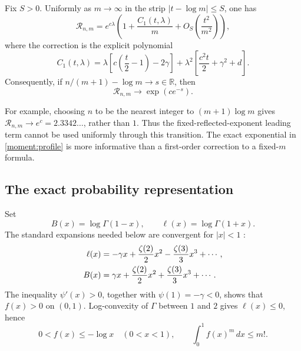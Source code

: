 \begin{theorem}\label{moment:thm:transition}
Fix $S>0$. Uniformly as $m\to\infty$ in the strip
$|t-\log m|\le S$, one has
\begin{equation}\label{moment:transition}
 \boxed{\displaystyle
 \mathcal R_{n,m}=e^{c\lambda}
 \left(1+\frac{C_1(t,\lambda)}m
              +O_S\!\left(\frac{t^2}{m^2}\right)\right),}
\end{equation}
where the correction is the explicit polynomial
\begin{equation}\label{moment:C1}
 C_1(t,\lambda)
 =\lambda\left[c\left(\frac t2-1\right)-2\gamma\right]
  +\lambda^2\left[\frac{c^2t}{2}+\gamma^2+d\right].
\end{equation}
Consequently, if $n/(m+1)-\log m\to s\in\mathbb R$, then
\begin{equation}\label{moment:profile}
 \mathcal R_{n,m}\longrightarrow \exp\!\left(c e^{-s}\right).
\end{equation}
\end{theorem}

For example, choosing $n$ to be the nearest integer to $(m+1)\log m$
gives $\mathcal R_{n,m}\to e^c=2.3342\ldots$, rather than $1$.
Thus the fixed-reflected-exponent leading term cannot be used uniformly
through this transition. The exact exponential in \eqref{moment:profile}
is more informative than a first-order correction to a fixed-$m$ formula.

\subsection{The exact probability representation}
Set
\[
 B(x)=\log\Gamma(1-x),\qquad \ell(x)=\log\Gamma(1+x).
\]
The standard expansions needed below are convergent for $|x|<1$
\cite[Section 5.7]{DLMF}:
\begin{align}\label{moment:endpoint-series}
 \ell(x)&=-\gamma x+\frac{\zeta(2)}2x^2
                    -\frac{\zeta(3)}3x^3+\cdots,\notag\\
 B(x)&=\gamma x+\frac{\zeta(2)}2x^2
                    +\frac{\zeta(3)}3x^3+\cdots.
\end{align}
The inequality $\psi'(x)>0$, together with $\psi(1)=-\gamma<0$,
shows that $f(x)>0$ on $(0,1)$. Log-convexity of $\Gamma$ between $1$
and $2$ gives $\ell(x)\le0$, hence
\begin{equation}\label{moment:elementary-bound}
 0<f(x)\le-\log x\quad(0<x<1),\qquad
 \int_0^1 f(x)^m\,dx\le m!.
\end{equation}

